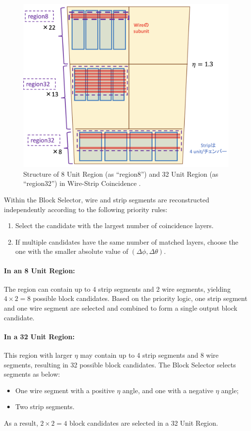 \begin{figure}[htbp]
  \centering
  \includegraphics[width=1.0\textwidth]{figs/chapter5/wsc_region.png}
  \caption{Structure of 8 Unit Region (as ``region8'') and 32 Unit Region (as ``region32'') in Wire-Strip Coincidence \cite{yamashita}.}
  \label{fig:wsc_region}
\end{figure}

Within the Block Selector, wire and strip segments are reconstructed independently according to the following priority rules:
\begin{enumerate}
  \item Select the candidate with the largest number of coincidence layers.
  \item If multiple candidates have the same number of matched layers, choose the one with the smaller absolute value of \((\Delta\phi, \Delta\theta)\).
\end{enumerate}

\paragraph{In an 8 Unit Region:}  
The region can contain up to 4 strip segments and 2 wire segments, yielding $4 \times 2 = 8$ possible block candidates. Based on the priority logic, one strip segment and one wire segment are selected and combined to form a single output block candidate.

\paragraph{In a 32 Unit Region:}  
This region with larger $\eta$ may contain up to 4 strip segments and 8 wire segments, resulting in 32 possible block candidates. The Block Selector selects segments as below:
\begin{itemize}
  \item One wire segment with a positive $\eta$ angle, and one with a negative $\eta$ angle;
  \item Two strip segments.
\end{itemize}
As a result, $2 \times 2 = 4$ block candidates are selected in a 32 Unit Region.

